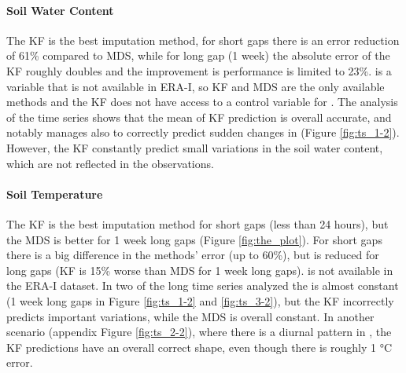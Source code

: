 \documentclass{article}
\begin{document}
\paragraph{Soil Water Content} The KF is the best imputation method, for short gaps there is an error reduction of 61\% compared to MDS, while for long gap (1 week) the absolute error of the KF roughly doubles and the improvement is performance is limited to 23\%.  is a variable that is not available in ERA-I, so KF and MDS are the only available methods and the KF does not have access to a control variable for .
The analysis of the time series shows that the mean of KF prediction is overall accurate, and notably manages also to correctly predict sudden changes in  (Figure \ref{fig:ts_1-2}). However, the KF constantly predict small variations in the soil water content, which are not reflected in the observations.

\paragraph{Soil Temperature} The KF is the best imputation method for short gaps (less than 24 hours), but the MDS is better for 1 week long gaps (Figure \ref{fig:the_plot}). For short gaps there is a big difference in the methods' error (up to 60\%), but is reduced for long gaps (KF is 15\% worse than MDS for 1 week long gaps).
 is not available in the ERA-I dataset.
In two of the long time series analyzed the  is almost constant (1 week long gaps in Figure \ref{fig:ts_1-2} and \ref{fig:ts_3-2}), but the KF incorrectly predicts important variations, while the MDS is overall constant. In another scenario (appendix Figure \ref{fig:ts_2-2}), where there is a diurnal pattern in , the KF predictions have an overall correct shape, even though there is roughly 1 °C error.


\newcommand{\CapTs}[2]{#1 to visualize the imputation of #2 using different methods: Kalman Filter, ERA-Interim (ERA-I) and Marginal Distribution Sampling (MDS). For each variable, three random artificial gap (length 6 hours, 12 hours, 1 week) are imputed using the three methods: Kalman Filter (green), ERA-I (orange), MDS (purple).  For the Kalman Filter the shared area show the uncertainty of the prediction $\pm 2 \sigma$ (standard deviation). The grey shaded area and the vertical black lines delimit the artificial gaps, where the observations are not available to the model but are used to assess the imputation performance. The ERA-I prediction is the control variable of the Kalman Filter. The Kalman Filter model has been fine-tuned to each variable (\textit{KF-\textlangle var\textrangle-Sin-6\_336}).}
\end{document}
